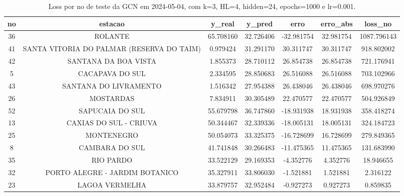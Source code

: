 \begin{table}[h]
\centering
\caption{Loss por no de teste da GCN em 2024-05-04, com k=3, HL=4, hidden=24, epochs=1000 e lr=0.001.}
\label{tab:gcn_loss_k3_hl4_h24_e1000_d20240504}
\begin{tabular}{ccccccc}
\toprule
no & estacao & y\_real & y\_pred & erro & erro\_abs & loss\_no \\
\midrule
36 & ROLANTE & 65.708160 & 32.726406 & -32.981754 & 32.981754 & 1087.796143 \\
41 & SANTA VITORIA DO PALMAR (RESERVA DO TAIM) & 0.979424 & 31.291170 & 30.311747 & 30.311747 & 918.802002 \\
42 & SANTANA DA BOA VISTA & 1.855373 & 28.710112 & 26.854738 & 26.854738 & 721.176941 \\
5 & CACAPAVA DO SUL & 2.334595 & 28.850683 & 26.516088 & 26.516088 & 703.102966 \\
43 & SANTANA DO LIVRAMENTO & 1.516342 & 27.954388 & 26.438046 & 26.438046 & 698.970276 \\
26 & MOSTARDAS & 7.834911 & 30.305489 & 22.470577 & 22.470577 & 504.926849 \\
52 & SAPUCAIA DO SUL & 55.679798 & 36.747860 & -18.931938 & 18.931938 & 358.418274 \\
13 & CAXIAS DO SUL - CRIUVA & 50.344467 & 32.339336 & -18.005131 & 18.005131 & 324.184723 \\
25 & MONTENEGRO & 50.054073 & 33.325375 & -16.728699 & 16.728699 & 279.849365 \\
8 & CAMBARA DO SUL & 41.741848 & 30.266483 & -11.475365 & 11.475365 & 131.683990 \\
35 & RIO PARDO & 33.522129 & 29.169353 & -4.352776 & 4.352776 & 18.946655 \\
32 & PORTO ALEGRE - JARDIM BOTANICO & 35.327911 & 33.806030 & -1.521881 & 1.521881 & 2.316122 \\
23 & LAGOA VERMELHA & 33.879757 & 32.952484 & -0.927273 & 0.927273 & 0.859835 \\
\bottomrule
\end{tabular}
\end{table}
